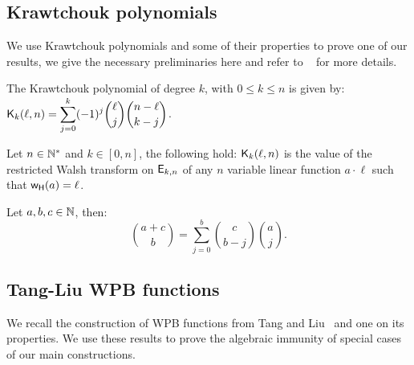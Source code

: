 \documentclass[11pt]{llncs}
\begin{document}
\subsection{Krawtchouk polynomials}
We use Krawtchouk polynomials and some of their properties to prove one of our results, we give the necessary preliminaries here and refer to \eg ~\cite{book:MacSlo78} for more details.

\begin{definition}\label{def:Kraw}
	The Krawtchouk polynomial of degree $k$, with $0\leq k\leq n$ is given by: $ \displaystyle \mathsf{K}_{k}(\ell,n)=\sum_{j=0}^{k} (-1)^j \binom{\ell}{j} \binom{n-\ell}{k-j}$. 
\end{definition}


\begin{Prop}\label{prop:Kr}
	Let $n\in \mathbb{N}^*$ and $k\in [0,n]$, the following hold:
 $\mathsf{K}_{k}(\ell,n)$ is the value of the restricted Walsh transform on $\mathsf{E}_{k,n}$ of any $n$ variable linear function $a\cdot \ell$ such that $\mathsf{w_H}(a)=\ell$.
\end{Prop}


\begin{Prop}\label{prop:Vandermonde}
	Let $a,b,c \in \mathbb{N}$, then:
	\begin{equation*}
	\binom{a+c}{b}=\sum_{j=0}^b\binom{c}{b-j}  \binom{a}{j}.
	\end{equation*}
\end{Prop}



\subsection{Tang-Liu WPB functions}

We recall the construction of WPB functions from Tang and Liu~\cite{CC:TangLiu19} and one on its properties. We use these results to prove the algebraic immunity of special cases of our main constructions.
\end{document}

